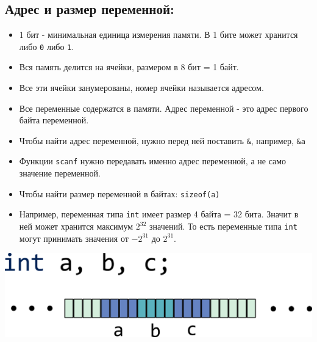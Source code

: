 \documentclass{article}
\begin{document}
\subsection*{Адрес и размер переменной:}
\begin{itemize}
\item 1 бит - минимальная единица измерения памяти. В 1 бите может хранится либо \texttt{0} либо \texttt{1}.
\item Вся память делится на ячейки, размером в 8 бит = 1 байт.
\item Все эти ячейки занумерованы, номер ячейки называется адресом.
\item Все переменные содержатся в памяти. Адрес переменной - это адрес первого байта переменной.
\item Чтобы найти адрес переменной, нужно перед ней поставить \texttt{\&}, например, \texttt{\&a}
\item Функции \texttt{scanf} нужно передавать именно адрес переменной, а не само значение переменной.
\item Чтобы найти размер переменной в байтах: \texttt{sizeof(a)}
\item Например, переменная типа \texttt{int} имеет размер 4 байта = 32 бита. Значит в ней может хранится максимум $2^{32}$ значений. То есть переменные типа \texttt{int} могут принимать значения от $-2^{31}$ до $2^{31}$.
\end{itemize}

\begin{center}
\includegraphics[scale=0.6]{../images/memory_ints.png}
\end{center}
\end{document}
